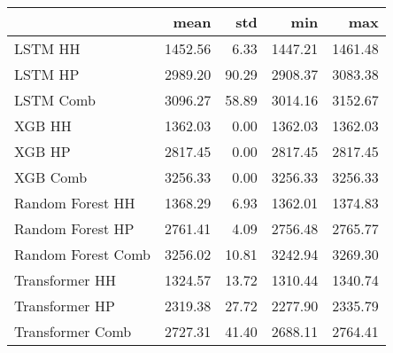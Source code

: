 \begin{tabular}{lrrrr}
\toprule
{} &    mean &   std &     min &     max \\
\midrule
LSTM HH            & 1452.56 &  6.33 & 1447.21 & 1461.48 \\
LSTM HP            & 2989.20 & 90.29 & 2908.37 & 3083.38 \\
LSTM Comb          & 3096.27 & 58.89 & 3014.16 & 3152.67 \\
XGB HH             & 1362.03 &  0.00 & 1362.03 & 1362.03 \\
XGB HP             & 2817.45 &  0.00 & 2817.45 & 2817.45 \\
XGB Comb           & 3256.33 &  0.00 & 3256.33 & 3256.33 \\
Random Forest HH   & 1368.29 &  6.93 & 1362.01 & 1374.83 \\
Random Forest HP   & 2761.41 &  4.09 & 2756.48 & 2765.77 \\
Random Forest Comb & 3256.02 & 10.81 & 3242.94 & 3269.30 \\
Transformer HH     & 1324.57 & 13.72 & 1310.44 & 1340.74 \\
Transformer HP     & 2319.38 & 27.72 & 2277.90 & 2335.79 \\
Transformer Comb   & 2727.31 & 41.40 & 2688.11 & 2764.41 \\
\bottomrule
\end{tabular}
